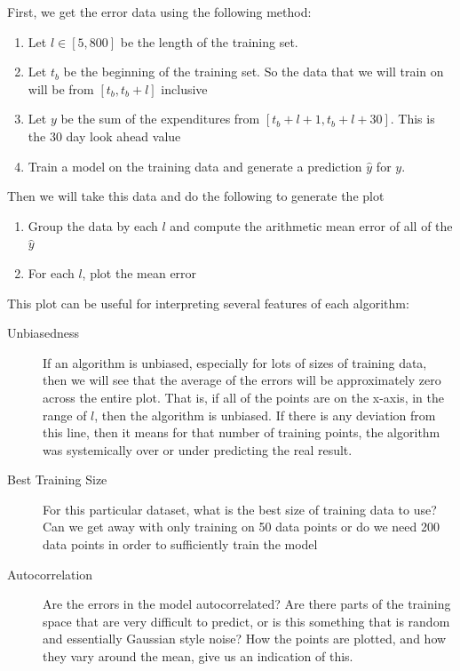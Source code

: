 \documentclass[11pt,a4paper]{article}
\begin{document}
First, we get the error data using the following method:
\begin{enumerate}
	\item Let $ l \in \left[ 5, 800 \right]   $ be the length of the training set. 
	\item Let $ t_b $ be the beginning of the training set. So the data that we will train on will be from $ \left[ t_b, t_b + l \right]  $ inclusive
	\item Let $y $ be the sum of the expenditures from $ \left[ t_b + l + 1, t_b + l + 30 \right]  $. This is the 30 day look ahead value
	\item Train a model on the training data and generate a prediction $ \hat{y} $ for $ y $. 
\end{enumerate}
Then we will take this data and do the following to generate the plot
\begin{enumerate}
	\item Group the data by each $ l $ and compute the arithmetic mean error of all of the $ \hat{y} $
	\item For each $ l $, plot the mean error
\end{enumerate}
This plot can be useful for interpreting several features of each algorithm:
\begin{description}
	\item[Unbiasedness] If an algorithm is unbiased, especially for lots of sizes of training data, then we will see that the average of the errors will be approximately zero across the entire plot. That is, if all of the points are on the x-axis, in the range of $ l $, then the algorithm is unbiased. If there is any deviation from this line, then it means for that number of training points, the algorithm was systemically over or under predicting the real result.
	\item[Best Training Size] For this particular dataset, what is the best size of training data to use? Can we get away with only training on 50 data points or do we need 200 data points in order to sufficiently train the model
	\item[Autocorrelation] Are the errors in the model autocorrelated? Are there parts of the training space that are very difficult to predict, or is this something that is random and essentially Gaussian style noise? How the points are plotted, and how they vary around the mean, give us an indication of this.  
\end{description}
\end{document}
